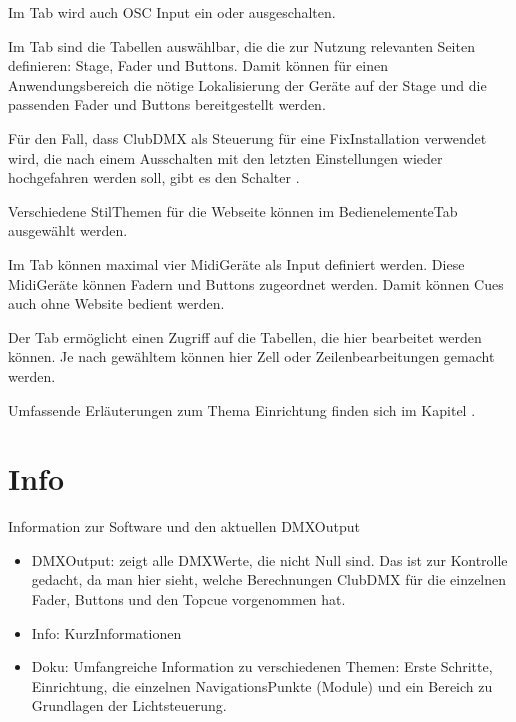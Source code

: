 \documentclass[letterpaper,10pt,ngerman]{sphinxmanual}
\begin{document}
Im \sphinxhyphen{}Tab wird auch OSC Input ein\sphinxhyphen{} oder ausgeschalten.

Im \sphinxhyphen{}Tab sind die Tabellen auswählbar, die die zur Nutzung
relevanten Seiten definieren: Stage, Fader und Buttons. Damit können für einen
Anwendungsbereich die nötige Lokalisierung der Geräte auf der Stage und die
passenden Fader und Buttons bereitgestellt werden.

Für den Fall, dass ClubDMX als Steuerung für eine Fix\sphinxhyphen{}Installation verwendet
wird, die nach einem Ausschalten mit den letzten Einstellungen wieder
hochgefahren werden soll, gibt es den Schalter .

Verschiedene Stil\sphinxhyphen{}Themen für die Webseite können im Bedienelemente\sphinxhyphen{}Tab
ausgewählt werden.

Im \sphinxhyphen{}Tab können maximal vier Midi\sphinxhyphen{}Geräte als Input definiert werden. Diese
Midi\sphinxhyphen{}Geräte können Fadern und Buttons zugeordnet werden. Damit können Cues
auch ohne Website bedient werden.

Der \sphinxhyphen{}Tab ermöglicht einen Zugriff auf die Tabellen, die hier
bearbeitet werden können. Je nach gewähltem {\hyperref[\detokenize{grundlagen:bearbeitungsmoduslabel}]{}}
können hier
Zell\sphinxhyphen{} oder Zeilenbearbeitungen gemacht werden.

Umfassende Erläuterungen zum Thema Einrichtung finden sich im
Kapitel {\hyperref[\detokenize{einrichten:einrichten-label}]{}} .


\section{Info}
\label{\detokenize{arbeiten:info}}
Information zur Software und den aktuellen DMX\sphinxhyphen{}Output
\begin{itemize}
\item {} 
DMX\sphinxhyphen{}Output: zeigt alle DMX\sphinxhyphen{}Werte, die nicht Null sind. Das ist
zur Kontrolle gedacht, da man hier sieht, welche Berechnungen ClubDMX
für die einzelnen Fader, Buttons und den Topcue vorgenommen hat.

\item {} 
Info: Kurz\sphinxhyphen{}Informationen

\item {} 
Doku: Umfangreiche Information zu verschiedenen Themen: Erste Schritte,
Einrichtung, die einzelnen Navigations\sphinxhyphen{}Punkte (Module) und ein Bereich
zu Grundlagen der Lichtsteuerung.

\end{itemize}
\end{document}

